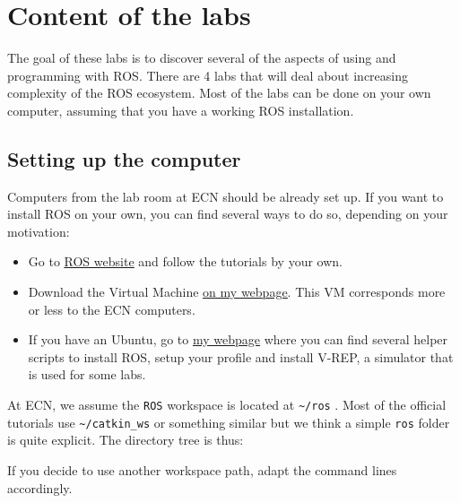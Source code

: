 \documentclass{ecnreport}
\author{G. Garcia, O. Kermorgant}
\newcommand{\link}[2]
{{\href{#1}{\color{blue}\underline{{#2}}}}}
\newcommand{\ttt}[1]
{
{\tt{#1}}
}
\begin{document}

\section*{Content of the labs}

The goal of these labs is to discover several of the aspects of using and programming with ROS. 
There are 4 labs that will deal about increasing complexity of the ROS ecosystem. Most of the labs can be done on your 
own computer, assuming that you have a working ROS installation. 

\subsection*{Setting up the computer}

Computers from the lab room at ECN should be already set up. If you want to install ROS on your own,
you can find several ways to do so, depending on your motivation:
\begin{itemize}
 \item Go to \link{www.ros.org}{ROS website} and follow the tutorials by your own.
 \item Download the Virtual Machine \link{http://www.irccyn.ec-nantes.fr/\~kermorga/coding\%20tools.html\#vm}{on my webpage}. This VM corresponds
 more or less to the ECN computers. 
 \item If you have an Ubuntu, go to \link{http://www.irccyn.ec-nantes.fr/\~kermorga/coding\%20tools.html\#scripts}{my webpage} where you 
 can find several helper scripts to install ROS, setup your profile and install V-REP, a simulator
 that is used for some labs. 
\end{itemize}

At ECN, we assume the \ttt{ROS} workspace is located at \ttt{\textasciitilde/ros}. Most of the official tutorials use \ttt{\textasciitilde/catkin\_ws} or something similar
but we think a simple \ttt{ros} folder is quite explicit. 
The directory tree is thus:
\begin{center}\begin{minipage}{.4\linewidth}
  \end{minipage}
\end{center}

If you decide to use another workspace path, adapt the command lines accordingly.
\end{document}
